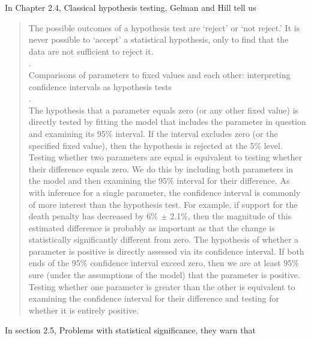 \documentclass[]{book}
\begin{document}
In Chapter 2.4, Classical hypothesis testing, Gelman and Hill tell us

\begin{quote}
The possible outcomes of a hypothesis test are `reject' or `not reject.' It is never possible to `accept' a statistical hypothesis, only to find that the data are not sufficient to reject it.\\
.\\
Comparisons of parameters to fixed values and each other: interpreting confidence intervals as hypothesis tests\\
.\\
The hypothesis that a parameter equals zero (or any other fixed value) is directly tested by fitting the model that includes the parameter in question and examining its 95\% interval. If the interval excludes zero (or the specified fixed value), then the hypothesis is rejected at the 5\% level.\\
Testing whether two parameters are equal is equivalent to testing whether their difference equals zero. We do this by including both parameters in the model and then examining the 95\% interval for their difference. As with inference for a single parameter, the confidence interval is commonly of more interest than the hypothesis test. For example, if support for the death penalty has decreased by 6\% \(\pm\) 2.1\%, then the magnitude of this estimated difference is probably as important as that the change is statistically significantly different from zero.
The hypothesis of whether a parameter is positive is directly assessed via its confidence interval. If both ends of the 95\% confidence interval exceed zero, then we are at least 95\% sure (under the assumptions of the model) that the parameter is positive. Testing whether one parameter is greater than the other is equivalent to examining the confidence interval for their difference and testing for whether it is entirely positive.
\end{quote}

In section 2.5, Problems with statistical significance, they warn that
\end{document}
